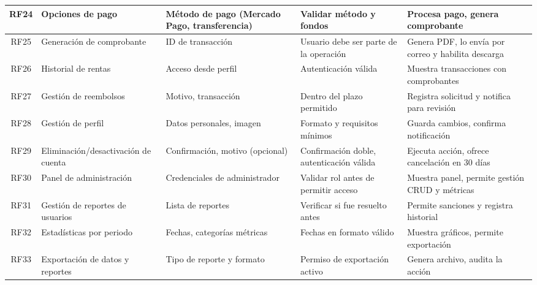 \begin{landscape}
\begin{longtable}{|c|p{4cm}|p{5cm}|p{5cm}|p{6cm}|}
		\hline
		RF24 & Opciones de pago & Método de pago (Mercado Pago, transferencia) & Validar método y fondos & Procesa pago, genera comprobante \\
		\hline
		RF25 & Generación de comprobante & ID de transacción & Usuario debe ser parte de la operación & Genera PDF, lo envía por correo y habilita descarga \\
		\hline
		RF26 & Historial de rentas & Acceso desde perfil & Autenticación válida & Muestra transacciones con comprobantes \\
		\hline
		RF27 & Gestión de reembolsos & Motivo, transacción & Dentro del plazo permitido & Registra solicitud y notifica para revisión \\
		\hline
		RF28 & Gestión de perfil & Datos personales, imagen & Formato y requisitos mínimos & Guarda cambios, confirma notificación \\
		\hline
		RF29 & Eliminación/desactivación de cuenta & Confirmación, motivo (opcional) & Confirmación doble, autenticación válida & Ejecuta acción, ofrece cancelación en 30 días \\
		\hline
		RF30 & Panel de administración & Credenciales de administrador & Validar rol antes de permitir acceso & Muestra panel, permite gestión CRUD y métricas \\
		\hline
		RF31 & Gestión de reportes de usuarios & Lista de reportes & Verificar si fue resuelto antes & Permite sanciones y registra historial \\
		\hline
		RF32 & Estadísticas por periodo & Fechas, categorías métricas & Fechas en formato válido & Muestra gráficos, permite exportación \\
		\hline
		RF33 & Exportación de datos y reportes & Tipo de reporte y formato & Permiso de exportación activo & Genera archivo, audita la acción \\
		\hline
	\end{longtable}
\end{landscape}